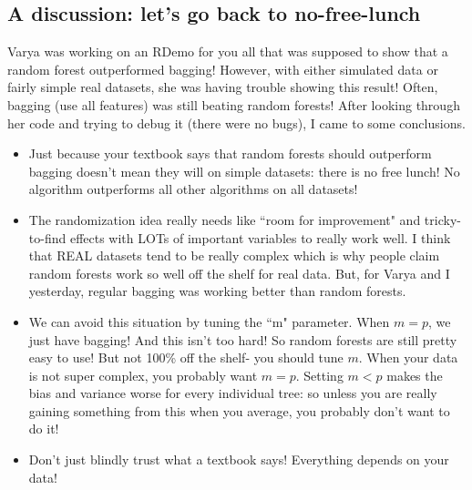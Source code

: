 \subsection{A discussion: let's go back to no-free-lunch}

Varya was working on an RDemo for you all that was supposed to show that a random forest outperformed bagging! However, with either simulated data or fairly simple real datasets, she was having trouble showing this result! Often, bagging (use all features) was still beating random forests! After looking through her code and trying to debug it (there were no bugs), I came to some conclusions. 

\begin{itemize}
\item Just because your textbook says that random forests should outperform bagging doesn't mean they will on simple datasets: there is no free lunch! No algorithm outperforms all other algorithms on all datasets! 
\item The randomization idea really needs like ``room for improvement" and tricky-to-find effects with LOTs of important variables to really work well. I think that REAL datasets tend to be really complex which is why people claim random forests work so well off the shelf for real data. But, for Varya and I yesterday, regular bagging was working better than random forests. 
\item We can avoid this situation by tuning the ``m" parameter. When $m=p$, we just have bagging! And this isn't too hard! So random forests are still pretty easy to use! But not 100\% off the shelf- you should tune $m$. When your data is not super complex, you probably want $m=p$. Setting $m < p$ makes the bias and variance worse for every individual tree: so unless you are really gaining something from this when you average, you probably don't want to do it!
\item Don't just blindly trust what a textbook says! Everything depends on your data!
\end{itemize}





